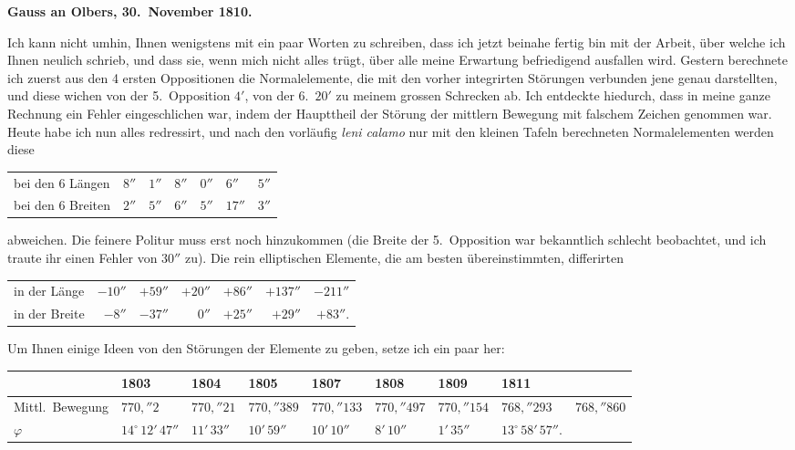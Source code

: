 \documentclass[12pt,a4paper]{article}
\begin{document}
\newpage
\setcounter{page}{427}
%
\medskip\noindent
\textbf{Gauss an Olbers, 30.~November 1810.}

Ich kann nicht umhin, Ihnen wenigstens mit ein paar Worten zu schreiben, dass ich jetzt beinahe fertig bin mit der Arbeit, über welche ich Ihnen neulich schrieb, und dass sie, wenn mich nicht alles trügt, über alle meine Erwartung befriedigend ausfallen wird. Gestern berechnete ich zuerst aus den 4 ersten Oppositionen die Normalelemente, die mit den vorher integrirten Störungen verbunden jene genau darstellten, und diese wichen von der 5.~Opposition $4'$, von der 6.~$20'$ zu meinem grossen Schrecken ab. Ich entdeckte hiedurch, dass in meine ganze Rechnung ein Fehler eingeschlichen war, indem der Haupttheil der Störung der mittlern Bewegung mit falschem Zeichen genommen war. Heute habe ich nun alles redressirt, und nach den vorläufig \textit{leni calamo} nur mit den kleinen Tafeln berechneten Normalelementen werden diese
\begin{center}
\begin{tabular}{l@{\quad}l@{\quad}l@{\quad}l@{\quad}l@{\quad}l}
\toprule
bei den 6 Längen & $8''$ & $1''$ & $8''$ & $0''$ & $6''$ & $5''$ \\
bei den 6 Breiten & $2''$ & $5''$ & $6''$ & $5''$ & $17''$ & $3''$ \\
\bottomrule
\end{tabular}
\end{center}
abweichen. Die feinere Politur muss erst noch hinzukommen (die Breite der 5.~Opposition war bekanntlich schlecht beobachtet, und ich traute ihr einen Fehler von $30''$ zu). Die rein elliptischen Elemente, die am besten übereinstimmten, differirten
\begin{center}
\begin{tabular}{l@{\quad}r@{\quad}r@{\quad}r@{\quad}r@{\quad}r@{\quad}r}
\toprule
in der Länge & $-10''$ & $+59''$ & $+20''$ & $+86''$ & $+137''$ & $-211''$ \\
in der Breite & $-8''$ & $-37''$ & $0''$ & $+25''$ & $+29''$ & $+83''$. \\
\bottomrule
\end{tabular}
\end{center}
Um Ihnen einige Ideen von den Störungen der Elemente zu geben, setze ich ein paar her:
\begin{center}
\begin{tabular}{l@{\quad}l@{\quad}l@{\quad}l@{\quad}l@{\quad}l@{\quad}l}
\toprule
& 1803 & 1804 & 1805 & 1807 & 1808 & 1809 & 1811 \\
\midrule
Mittl.~Bewegung & $770{,}''2$ & $770{,}''21$ & $770{,}''389$ & $770{,}''133$ & $770{,}''497$ & $770{,}''154$ & $768{,}''293$ & $768{,}''860$ \\
$\varphi$ & $14^\circ\,12'\,47''$ & $11'\,33''$ & $10'\,59''$ & $10'\,10''$ & $8'\,10''$ & $1'\,35''$ & $13^\circ\,58'\,57''$. \\
\bottomrule
\end{tabular}
\end{center}
\end{document}
